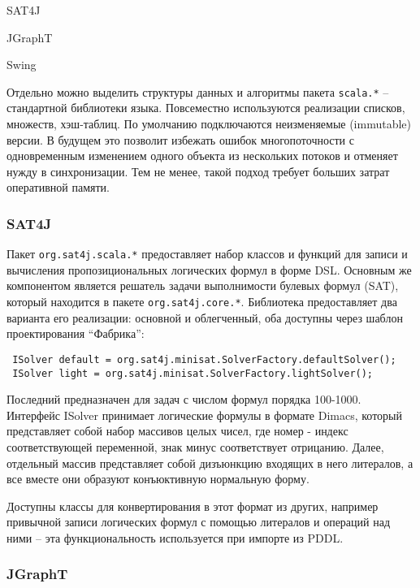 \begin{itemize*}
 \item SAT4J
 \item JGraphT
 \item Swing
\end{itemize*}

Отдельно можно выделить структуры данных и алгоритмы пакета \lstinline{scala.*} -- стандартной библиотеки языка. Повсеместно используются реализации списков, множеств, хэш-таблиц. По умолчанию подключаются неизменяемые (immutable) версии. В будущем это позволит избежать ошибок многопоточности с одновременным изменением одного объекта из нескольких потоков и отменяет нужду в синхронизации. Тем не менее, такой подход требует больших затрат оперативной памяти.

\subsubsection{SAT4J}

Пакет \lstinline{org.sat4j.scala.*} предоставляет набор классов и функций для записи и вычисления пропозициональных логических формул в форме DSL. Основным же компонентом является решатель задачи выполнимости булевых формул (SAT), который находится в пакете \lstinline{org.sat4j.core.*}. Библиотека предоставляет два варианта его реализации: основной и облегченный, оба доступны через шаблон проектирования ``Фабрика'':

\begin{lstlisting}
 ISolver default = org.sat4j.minisat.SolverFactory.defaultSolver();
 ISolver light = org.sat4j.minisat.SolverFactory.lightSolver();
\end{lstlisting}

Последний предназначен для задач с числом формул порядка 100-1000. Интерфейс ISolver принимает логические формулы в формате Dimacs, который представляет собой набор массивов целых чисел, где номер - индекс соответствующей переменной, знак минус соответствует отрицанию. Далее, отдельный массив представляет собой дизъюнкцию входящих в него литералов, а все вместе они образуют конъюктивную нормальную форму.

Доступны классы для конвертирования в этот формат из других, например привычной записи логических формул с помощью литералов и операций над ними -- эта функциональность используется при импорте из PDDL.

\subsubsection{JGraphT}

